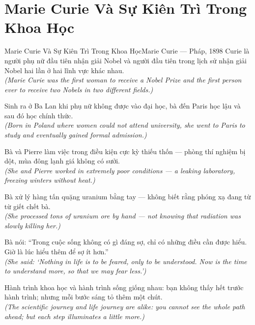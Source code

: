 \section{Marie Curie Và Sự Kiên Trì Trong Khoa Học}
\begin{truyen}{Marie Curie Và Sự Kiên Trì Trong Khoa Học}{Marie Curie --- Pháp, 1898}
 Curie là người phụ nữ đầu tiên nhận giải Nobel và người đầu tiên trong lịch sử nhận giải Nobel hai lần ở hai lĩnh vực khác nhau.\\[4pt]
\textit{(Marie Curie was the first woman to receive a Nobel Prize and the first person ever to receive two Nobels in two different fields.)}

Sinh ra ở Ba Lan khi phụ nữ không được vào đại học, bà đến Paris học lậu và sau đó học chính thức.\\[4pt]
\textit{(Born in Poland where women could not attend university, she went to Paris to study and eventually gained formal admission.)}

Bà và Pierre làm việc trong điều kiện cực kỳ thiếu thốn --- phòng thí nghiệm bị dột, mùa đông lạnh giá không có sưởi.\\[4pt]
\textit{(She and Pierre worked in extremely poor conditions --- a leaking laboratory, freezing winters without heat.)}

Bà xử lý hàng tấn quặng uranium bằng tay --- không biết rằng phóng xạ đang từ từ giết chết bà.\\[4pt]
\textit{(She processed tons of uranium ore by hand --- not knowing that radiation was slowly killing her.)}

Bà nói: ``Trong cuộc sống không có gì đáng sợ, chỉ có những điều cần được hiểu. Giờ là lúc hiểu thêm để sợ ít hơn.''\\[4pt]
\textit{(She said: `Nothing in life is to be feared, only to be understood. Now is the time to understand more, so that we may fear less.')}

\end{truyen}
\begin{baihoc}
  Hành trình khoa học và hành trình sống giống nhau: bạn không thấy hết trước hành trình; nhưng mỗi bước sáng tỏ thêm một chút.\\[4pt]
  \textit{(The scientific journey and life journey are alike: you cannot see the whole path ahead; but each step illuminates a little more.)}
\end{baihoc}

